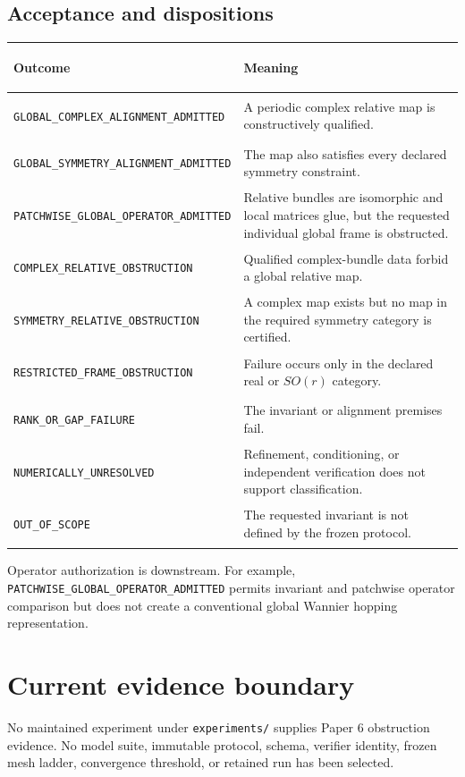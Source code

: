 \documentclass[11pt]{article}
\newenvironment{prospective}{\color{prospectivered}}{}
\begin{document}
\begin{prospective}
\subsection{Acceptance and dispositions}
\begin{center}\small
\begin{tabularx}{\textwidth}{>{\bfseries\raggedright\arraybackslash}p{}Y}
\toprule
Outcome & Meaning \\
\midrule
\nolinkurl{GLOBAL_COMPLEX_ALIGNMENT_ADMITTED} & A periodic complex relative map is constructively qualified. \\
\nolinkurl{GLOBAL_SYMMETRY_ALIGNMENT_ADMITTED} & The map also satisfies every declared symmetry constraint. \\
\nolinkurl{PATCHWISE_GLOBAL_OPERATOR_ADMITTED} & Relative bundles are isomorphic and local matrices glue, but the requested individual global frame is obstructed. \\
\nolinkurl{COMPLEX_RELATIVE_OBSTRUCTION} & Qualified complex-bundle data forbid a global relative map. \\
\nolinkurl{SYMMETRY_RELATIVE_OBSTRUCTION} & A complex map exists but no map in the required symmetry category is certified. \\
\nolinkurl{RESTRICTED_FRAME_OBSTRUCTION} & Failure occurs only in the declared real or $SO(r)$ category. \\
\nolinkurl{RANK_OR_GAP_FAILURE} & The invariant or alignment premises fail. \\
\nolinkurl{NUMERICALLY_UNRESOLVED} & Refinement, conditioning, or independent verification does not support classification. \\
\nolinkurl{OUT_OF_SCOPE} & The requested invariant is not defined by the frozen protocol. \\
\bottomrule
\end{tabularx}
\end{center}
Operator authorization is downstream. For example,
\nolinkurl{PATCHWISE_GLOBAL_OPERATOR_ADMITTED} permits invariant and patchwise operator
comparison but does not create a conventional global Wannier hopping representation.
\end{prospective}

\section{Current evidence boundary}
No maintained experiment under \texttt{experiments/} supplies Paper 6 obstruction
evidence. No model suite, immutable protocol, schema, verifier identity, frozen mesh
ladder, convergence threshold, or retained run has been selected.
\end{document}
